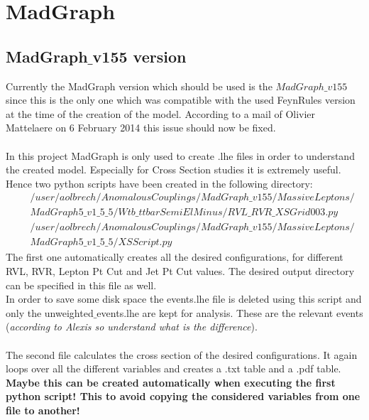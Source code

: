 
\section{MadGraph}

\subsection{MadGraph$\_$v155 version}
Currently the MadGraph version which should be used is the $MadGraph\_v155$ since this is the only one which was compatible with the used FeynRules version at the time of the creation of the model. According to a mail of Olivier Mattelaere on 6 February 2014 this issue should now be fixed.\\
\\
In this project MadGraph is only used to create .lhe files in order to understand the created model. Especially for Cross Section studies it is extremely useful.\\
Hence two python scripts have been created in the following directory:
\begin{eqnarray*}
  & & /user/aolbrech/AnomalousCouplings/MadGraph\_v155/MassiveLeptons/\\ & & MadGraph5\_v1\_5\_5/Wtb\_ttbarSemiElMinus/RVL\_RVR\_XSGrid003.py \\
  & & /user/aolbrech/AnomalousCouplings/MadGraph\_v155/MassiveLeptons/\\ & & MadGraph5\_v1\_5\_5/XSScript.py
\end{eqnarray*}
The first one automatically creates all the desired configurations, for different RVL, RVR, Lepton Pt Cut and Jet Pt Cut values. The desired output directory can be specified in this file as well.\\
In order to save some disk space the events.lhe file is deleted using this script and only the unweighted$\_$events.lhe are kept for analysis. These are the relevant events (\textit{according to Alexis so understand what is the difference}).\\
\\
The second file calculates the cross section of the desired configurations. It again loops over all the different variables and creates a .txt table and a .pdf table.\\
\textbf{Maybe this can be created automatically when executing the first python script! This to avoid copying the considered variables from one file to another!}

